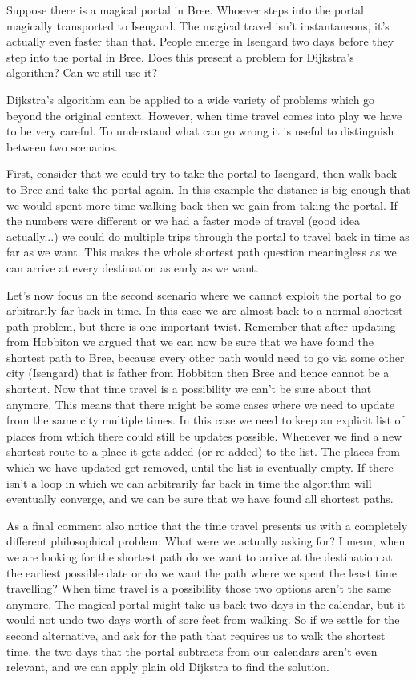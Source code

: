 Suppose there is a magical portal in Bree. Whoever steps into the portal magically transported to Isengard. The magical travel isn't instantaneous, it's actually even faster than that. People emerge in Isengard two days before they step into the portal in Bree. Does this present a problem for  Dijkstra's algorithm? Can we still use it?

\solution
Dijkstra's algorithm can be applied to a wide variety of problems which go beyond the original context. However, when time travel comes into play we have to be very careful.
To understand what can go wrong it is useful to distinguish between two scenarios.

First, consider that we could try to take the portal to Isengard, then walk back to Bree and take the portal again. In this example the distance is big enough that we would spent more time walking back then we gain from taking the portal. If the numbers were different or we had a faster mode of travel (good idea actually...) we could do multiple trips through the portal to travel back in time as far as we want. This makes the whole shortest path question meaningless as we can arrive at every destination as early as we want. 

Let's now focus on the second scenario where we cannot exploit the portal to go arbitrarily far back in time. In this case we are almost back to a normal shortest path problem, but there is one important twist. Remember that after updating from Hobbiton we argued that we can now be sure that we have found the shortest path to Bree, because every other path would need to go via some other city (Isengard) that is father from Hobbiton then Bree and hence cannot be a shortcut. Now that time travel is a possibility we can't be sure about that anymore. This means that there might be some cases where we need to update from the same city multiple times. In this case we need to keep an explicit list of places from which there could still be updates possible. Whenever we find a new shortest route to a place it gets added (or re-added) to the list. The places from which we have updated get removed, until the list is eventually empty. If there isn't a loop in which we can arbitrarily far back in time the algorithm will eventually converge, and we can be sure that we have found all shortest paths. 

As a final comment also notice that the time travel presents us with a completely different philosophical problem: What were we actually asking for? I mean, when we are looking for the shortest path do we want to arrive at the destination at the earliest possible date or do we want the path where we spent the least time travelling? When time travel is a possibility those two options aren't the same anymore. The magical portal might take us back two days in the calendar, but it would not undo two days worth of sore feet from walking. So if we settle for the second alternative, and ask for the path that requires us to walk the shortest time, the two days that the portal subtracts from our calendars aren't even relevant, and we can apply plain old Dijkstra to find the solution.  
